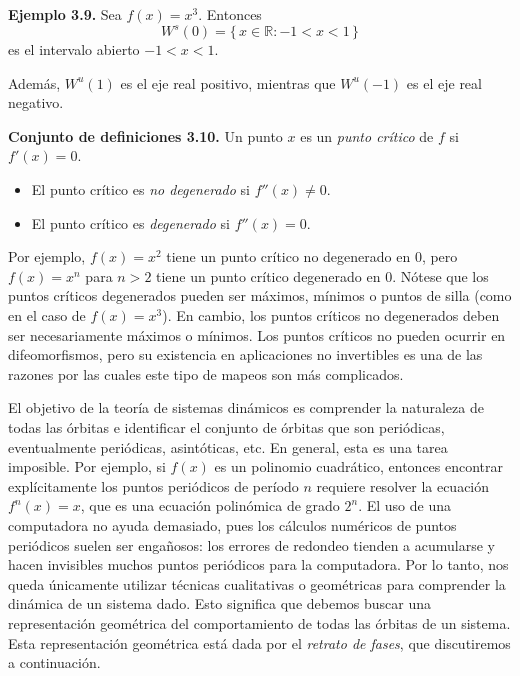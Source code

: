 \documentclass[10pt,a4paper]{book}
\begin{document}
\textbf{Ejemplo 3.9.} Sea $f(x) = x^{3}$. Entonces 
\[
W^{s}(0) = \{\, x \in \mathbb{R} : -1 < x < 1 \,\}
\]
es el intervalo abierto $-1 < x < 1$.  

Además, $W^{u}(1)$ es el eje real positivo, mientras que $W^{u}(-1)$ es el eje real negativo.

\newpage

\textbf{Conjunto de definiciones 3.10.} Un punto $x$ es un \emph{punto crítico} de $f$ si $f'(x)=0$. 
\begin{itemize}
	\item El punto crítico es \emph{no degenerado} si $f''(x)\neq 0$.  
	\item El punto crítico es \emph{degenerado} si $f''(x)=0$.
\end{itemize} 


\medskip

Por ejemplo, $f(x)=x^{2}$ tiene un punto crítico no degenerado en $0$, pero $f(x)=x^{n}$ para $n>2$ tiene un punto crítico degenerado en $0$. Nótese que los puntos críticos degenerados pueden ser máximos, mínimos o puntos de silla (como en el caso de $f(x)=x^{3}$). En cambio, los puntos críticos no degenerados deben ser necesariamente máximos o mínimos. Los puntos críticos no pueden ocurrir en difeomorfismos, pero su existencia en aplicaciones no invertibles 
es una de las razones por las cuales este tipo de mapeos son más complicados.

\medskip

El objetivo de la teoría de sistemas dinámicos es comprender la naturaleza de todas las órbitas e identificar el conjunto de órbitas que son periódicas, eventualmente periódicas, asintóticas, etc. En general, esta es una tarea imposible. Por ejemplo, si $f(x)$ es un polinomio cuadrático, entonces encontrar explícitamente los puntos periódicos de período $n$ requiere resolver la ecuación $f^{n}(x)=x$, que es una ecuación polinómica de grado $2^{n}$. El uso de una computadora no ayuda demasiado, pues los cálculos numéricos de puntos periódicos suelen ser engañosos: los errores de redondeo tienden a acumularse y hacen invisibles muchos puntos periódicos para la computadora. Por lo tanto, nos queda únicamente utilizar técnicas cualitativas o geométricas para comprender la dinámica de un sistema dado. Esto significa que debemos buscar una representación geométrica del comportamiento de todas las órbitas de un sistema. Esta representación geométrica está dada por el \emph{retrato de fases}, que discutiremos a continuación.

\medskip
\end{document}
